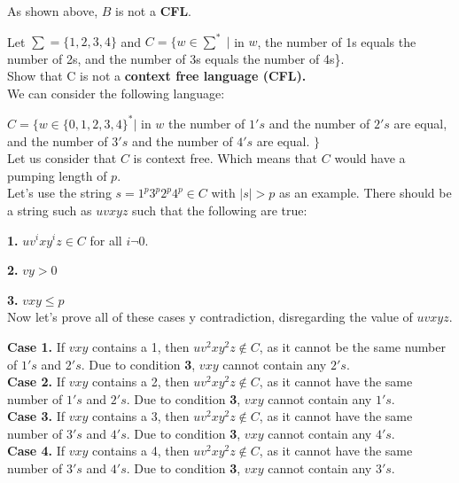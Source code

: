 \documentclass[12pt]{article}
\begin{document}
As shown above, $B$ is not a \textbf{CFL}.

 Let $\sum = \{1, 2, 3, 4\}$ and $C = \{w \in \sum^* \; | $ in $w$, the number of 1s 
equals the number of 2s, and the number of 3s equals the number of 4s\}. \\
Show that C is not a \textbf{context free language (CFL).} \\

We can consider the following language:

$C = \{ w \in \{0, 1, 2, 3, 4 \}^* | $ in $w$ the number of $1's$ and the number of
$2's$ are equal, and the number of $3's$ and the number of $4's$ are equal. $\}$ \\

Let us consider that $C$ is context free. Which means that $C$ would have a pumping
length of $p$. \\

Let's use the string $s = 1^p 3^p 2^p 4^p \in C$ with $|s| > p$ as an example.
There should be a string such as $uvxyz$ such that the following are true:

\textbf{1.} $u v^i x y^i z \in C$ for all $i \neg 0$.

\textbf{2.} $vy > 0$

\textbf{3.} $vxy \le p$ \\

Now let's prove all of these cases y contradiction, disregarding the value of $uvxyz$.

\textbf{Case 1.} If $vxy$ contains a 1, then $u v^2 x y^2 z \notin C$, as it cannot
be the same number of $1's$ and $2's$. Due to condition \textbf{3}, $vxy$ cannot
contain any $2's$. \\

\textbf{Case 2.} If $vxy$ contains a 2, then $u v^2 x y^2 z \notin C$, as it cannot
have the same number of $1's$ and $2's$. Due to condition \textbf{3}, $vxy$ cannot
contain any $1's$. \\

\textbf{Case 3.} If $vxy$ contains a 3, then $u v^2 x y^2 z \notin C$, as it cannot
have the same number of $3's$ and $4's$. Due to condition \textbf{3}, $vxy$ cannot
contain any $4's$. \\

\textbf{Case 4.} If $vxy$ contains a 4, then $u v^2 x y^2 z \notin C$, as it cannot
have the same number of $3's$ and $4's$. Due to condition \textbf{3}, $vxy$ cannot
contain any $3's$. \\
\end{document}
